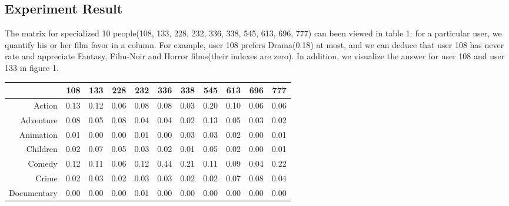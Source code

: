 \subsection{Experiment Result}
The matrix for specialized 10 people(108, 133, 228, 232, 336, 338, 545, 613, 696, 777) can been viewed in table 1: for a particular user, we quantify his or her film favor in a column. For example, user 108 prefers Drama(0.18) at most, and we can deduce that user 108 has never rate and appreciate Fantasy, Film-Noir and Horror films(their indexes are zero). In addition, we visualize the answer for user 108 and user 133 in figure 1.
\begin{table}
\begin{tabular}{rrrrrrrrrrr}

           &        108 &        133 &        228 &        232 &        336 &        338 &        545 &        613 &        696 &        777  \\  \hline

    Action &      0.13  &      0.12  &      0.06  &      0.08  &      0.08  &      0.03  &      0.20  &      0.10  &      0.06  &      0.06  \\

 Adventure &      0.08  &      0.05  &      0.08  &      0.04  &      0.04  &      0.02  &      0.13  &      0.05  &      0.03  &      0.02  \\

 Animation &      0.01  &      0.00  &      0.00  &      0.01  &      0.00  &      0.03  &      0.03  &      0.02  &      0.00  &      0.01  \\

  Children &      0.02  &      0.07  &      0.05  &      0.03  &      0.02  &      0.01  &      0.05  &      0.02  &      0.00  &      0.01  \\

    Comedy &      0.12  &      0.11  &      0.06  &      0.12  &      0.44  &      0.21  &      0.11  &      0.09  &      0.04  &      0.22  \\

     Crime &      0.02  &      0.03  &      0.02  &      0.03  &      0.03  &      0.02  &      0.02  &      0.07  &      0.08  &      0.04  \\

Documentary &      0.00  &      0.00  &      0.00  &      0.01  &      0.00  &      0.00  &      0.00  &      0.00  &      0.00  &      0.00  \\


\end{tabular}
\end{table}
